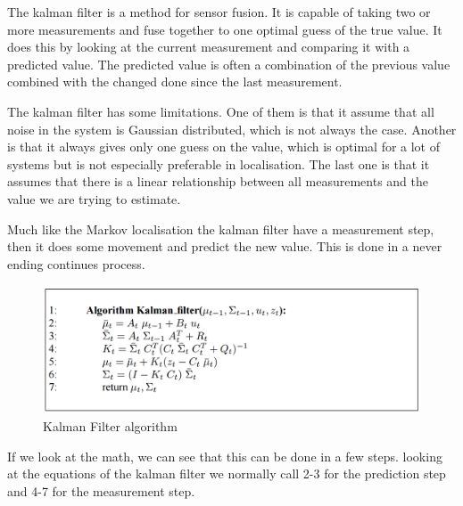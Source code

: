 The kalman filter is a method for sensor fusion. It is capable of taking two or more measurements and fuse together to one optimal guess of the true value. It does this by looking at the current measurement and comparing it with a predicted value. The predicted value is often a combination of the previous value combined with the changed done since the last measurement. 

The kalman filter has some limitations. One of them is that it assume that all noise in the system is Gaussian distributed, which is not always the case. Another is that it always gives only one guess on the value, which is optimal for a lot of systems but is not especially preferable in localisation. The last one is that it assumes that there is a linear relationship between all measurements and the value we are trying to estimate. 

Much like the Markov localisation the kalman filter have a measurement step, then it does some movement and predict the new value. This is done in a never ending continues process. 
\begin{figure}[H]
\centering
\includegraphics[width=1\textwidth]{billeder/KalmanFilter.png}
\caption{Kalman Filter algorithm}
\label{fig:kalmanfilter}
\end{figure}
If we look at the math, we can see that this can be done in a few steps. looking at the equations of the kalman filter we normally call 2-3 for the prediction step and 4-7 for the measurement step. 

